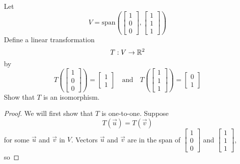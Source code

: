 \documentclass{ximera}
\begin{document}
\begin{example}\label{ex:subtosub} Let $$V=\text{span}\left(\begin{bmatrix}1\\0\\0\end{bmatrix}, \begin{bmatrix}1\\1\\1\end{bmatrix}\right)$$
Define a linear transformation $$T:V\rightarrow \mathbb{R}^2$$
by $$T\left(\begin{bmatrix}1\\0\\0\end{bmatrix}\right)=\begin{bmatrix}1\\1\end{bmatrix}\quad \text{and} \quad T\left(\begin{bmatrix}1\\1\\1\end{bmatrix}\right)=\begin{bmatrix}0\\1\end{bmatrix}$$
Show that $T$ is an isomorphism.
\begin{proof}

We will first show that $T$ is one-to-one.  
Suppose 
$$T(\vec{u})=T(\vec{v})$$
for some $\vec{u}$ and $\vec{v}$ in $V$. Vectors $\vec{u}$ and $\vec{v}$ are in the span of $\begin{bmatrix}1\\0\\0\end{bmatrix}$ and $\begin{bmatrix}1\\1\\1\end{bmatrix}$, so


\end{proof}
\end{example}
\end{document}
